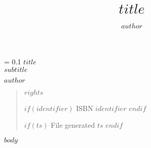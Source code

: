 \documentclass[10pt,twoside,openright]{book}
\title{$title$}
\author{$author$}
\newcommand*{\titleBook}{\begingroup
\thispagestyle{empty}
\newlength{\drop}
\drop = 0.1\textheight
\parindent=0pt
\vspace*{\drop}
{\Huge\bfseries $title$}\\[\baselineskip]
{\Large $subtitle$}\par
\vfill
{\Large {\scshape $author$}}
\vspace*{\drop}
\endgroup}
\begin{document}
\frontmatter
\titleBook

\newpage
\vspace*{7em}
\begin{quote}
\begin{small}
$rights$

$if(identifier)$
ISBN $identifier$
$endif$

$if(ts)$
File generated $ts$
$endif$
\end{small}
\end{quote}
\newpage

\setcounter{tocdepth}{0}
\tableofcontents

\mainmatter
\onehalfspacing

$body$

\backmatter


\end{document}
